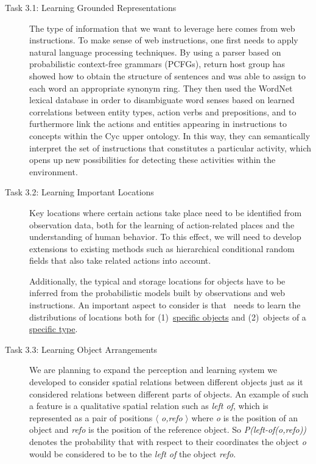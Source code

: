 \begin{description}
\item[Task 3.1: Learning Grounded Representations] The
  type of information that we want to leverage here comes from web instructions.
  To make sense of web instructions, one first needs to apply natural language
  processing techniques. By using a parser based on probabilistic
  context-free grammars (PCFGs),
  return host group has showed how to obtain the structure of sentences and was able to assign to each word an appropriate synonym ring.
  They then used the WordNet lexical database in order to disambiguate word senses based on learned
  correlations between entity types, action verbs and prepositions, and to furthermore
  link the actions and entities appearing in instructions to concepts within the Cyc
  upper ontology. In this way, they can semantically interpret the set of instructions that
  constitutes a particular activity, which opens up 
  new possibilities for detecting these activities within the environment.

\item[Task 3.2: Learning Important Locations] 
  Key locations where certain actions take place need to be identified from
  observation data, both for the learning of action-related places
  and the understanding of human behavior. To this effect, we will need to develop extensions
  to existing methods such as hierarchical conditional random fields
  that also take related actions into account.

  Additionally, the typical and storage locations for objects have to
  be inferred from the probabilistic models built by observations and
  web instructions.
  An important aspect to consider is that \ksem\ needs to learn the distributions
  of locations both for (1)~\underline{specific objects} and (2)~objects of a
  \underline{specific type}.

\item[Task 3.3: Learning Object Arrangements]
  We are planning to expand the perception and learning system we developed
  to consider spatial relations between different objects just as it considered relations between
  different parts of objects.
  An example of such a feature is a qualitative spatial relation
  such as \emph{left of}, which is represented as a 
  pair of positions $\langle$ \emph{o,refo} $\rangle$ where
  \emph{o} is the position of an object and
  \emph{refo} is the position of the reference object. So
  \emph{P(left-of(o,refo))} denotes the probability that with
  respect to their coordinates the object \emph{o} would be
  considered to be to the \emph{left of} the object \emph{refo}.


\end{description}
